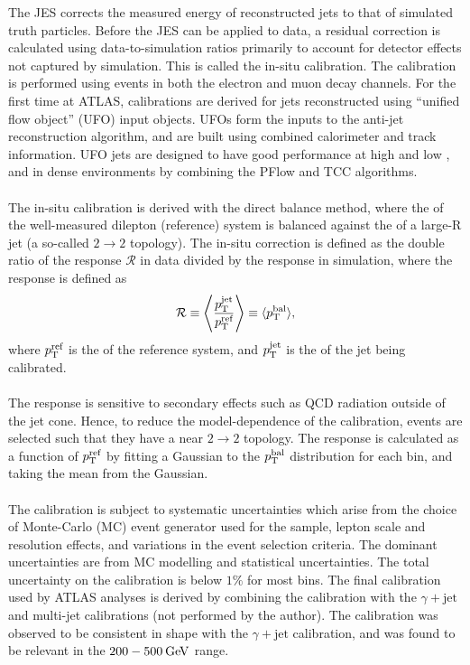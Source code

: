 \documentclass{thesissummary}
\begin{document}
The JES corrects the measured energy of reconstructed jets to that of simulated truth particles. Before the JES can be applied to data, a residual correction is calculated using data-to-simulation ratios primarily to account for detector effects not captured by simulation. This is called the in-situ calibration. The calibration is performed using \zjet events in both the electron and muon decay channels. For the first time at ATLAS, calibrations are derived for jets reconstructed using ``unified flow object'' (UFO) input objects. UFOs form the inputs to the anti-\kt jet reconstruction algorithm, and are built using combined calorimeter and track information. UFO jets are designed to have good performance at high and low \pt, and in dense environments by combining the PFlow \cite{pflow} and TCC \cite{tcc} algorithms.
\\\\
The in-situ calibration is derived with the direct balance method, where the \pt of the well-measured dilepton (reference) system is balanced against the \pt of a large-R jet (a so-called $2\rightarrow2$ topology). The in-situ correction is defined as the double ratio of the response $\mathcal{R}$ in data divided by the response in simulation, where the response is defined as 
\begin{equation}
    \mathcal{R} \equiv \Bigg\langle\frac{p_{\text{T}}^{\text{jet}}}{p_{\text{T}}^{\text{ref}}}\Bigg\rangle \equiv \langle p_{\text{T}}^{\text{bal}}\rangle,
\end{equation}
where $p_{\text{T}}^{\text{ref}}$ is the \pt of the reference system, and $p_{\text{T}}^{\text{jet}}$ is the \pt of the jet being calibrated.
\\\\
The response is sensitive to secondary effects such as QCD radiation outside of the jet cone. Hence, to reduce the model-dependence of the calibration, events are selected such that they have a near $2\rightarrow2$ topology. The response is calculated as a function of $p_{\text{T}}^{\text{ref}}$ by fitting a Gaussian to the $p_{\text{T}}^{\text{bal}}$ distribution for each bin, and taking the mean from the Gaussian.%
\\\\
The calibration is subject to systematic uncertainties which arise from the choice of Monte-Carlo (MC) event generator used for the \zjet sample, lepton scale and resolution effects, and variations in the event selection criteria. The dominant uncertainties are from MC modelling and statistical uncertainties. The total uncertainty on the calibration is below $1\%$ for most bins. The final calibration used by ATLAS analyses is derived by combining the \zjet calibration with the $\gamma+\text{jet}$ and multi-jet calibrations (not performed by the author). The \zjet calibration was observed to be consistent in shape with the $\gamma+\text{jet}$ calibration, and was found to be relevant in the $200-500\hspace{2pt}\text{Ge\kern -0.1em V}$ range.
\end{document}
